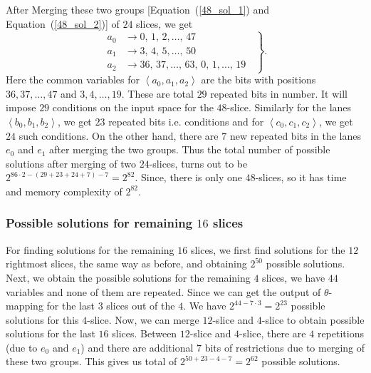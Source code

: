 \documentclass[runningheads]{llncs}
\begin{document}
After Merging these two groups [Equation~(\ref{48_sol_1}) and 
Equation~(\ref{48_sol_2})] of $24$ slices, we get
\begin{equation}
	\left.
	\begin{aligned}       
    a_0 &\rightarrow 0,\, 1,\, 2,\ldots ,\, 47\\
    a_1 & \rightarrow 3,\, 4,\, 5,\ldots ,\, 50\\
    a_2 & \rightarrow 36,\, 37,\ldots,\, 63,\, 0,\, 1,\ldots ,\, 19
    \end{aligned}
	\;\;\right\}.
\end{equation}
Here the common variables for $\left< a_0, a_1,a_2\right>$ are the bits with positions
$36, 37 ,\ldots, 47$ and $ 3, 4,\ldots,19$. These are total $29$ repeated bits in number. It will impose $29$ conditions on the input space for the $48$-slice.
Similarly for the lanes $\left< b_0, b_1,b_2\right>$, we get $23$ repeated bits i.e. conditions and for $\left< c_0, c_1,c_2 \right>$, we get $24$ such conditions.
On the other hand, there are $7$ new repeated bits in the lanes $e_0$ and $e_1$ after merging the two groups. Thus the total number of possible solutions after merging of two $24$-slices, turns out to be $2^{86\cdot 2 - (29 + 23 + 24 + 7) - 7 } = 2^{82}$. Since, there is only one $48$-slices, so it has time and memory complexity of $2^{82}$.

\subsubsection{Possible solutions for remaining $16$ slices} 
For finding solutions for the remaining $16$ slices, we first find solutions for the $12$ rightmost slices, the same way as before, and obtaining $2^{50}$ possible solutions. 
Next, we obtain the possible solutions for the remaining $4$ slices, we have $44$ variables and none of them are repeated. Since we can get the output of $\theta$-mapping for the last $3$ slices out of the $4$. We have  $2^{44 - 7\cdot 3} = 2^{23}$ possible solutions for this $4$-slice.
Now, we can merge $12$-slice and $4$-slice to obtain possible solutions for the last $16$ slices. Between $12$-slice and $4$-slice, there are $4$ repetitions (due to $e_0$ and $e_1$) and there are additional $7$ bits of restrictions due to merging of these two groups. This gives us total of $2^{50 + 23 - 4 -7} = 2^{62}$ possible solutions.
\end{document}

